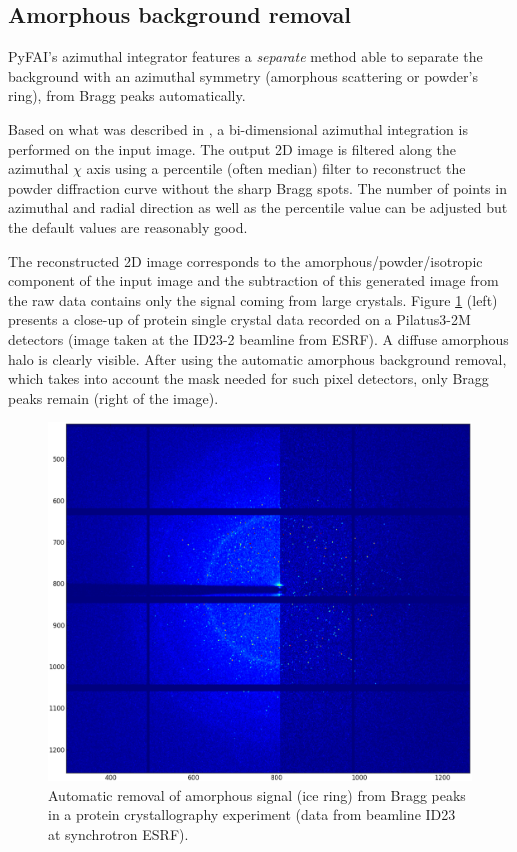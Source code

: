 \documentclass[preprint]{iucr}
\begin{document}
\subsection{Amorphous background removal}

PyFAI's azimuthal integrator features a \textit{separate} method able to separate
the background with an azimuthal symmetry (amorphous scattering or powder's
ring), from Bragg peaks automatically.

Based on what was described in \cite{PyFAI_PDJ}, a bi-dimensional azimuthal
integration is performed on the input image.
The output 2D image is filtered along the azimuthal $\chi$ axis using a
percentile (often median) filter to reconstruct the powder diffraction curve
without the sharp Bragg spots.
The number of points in azimuthal and radial direction as well as
the percentile value can be adjusted but the default values are reasonably
good.

The reconstructed 2D image corresponds to the amorphous/powder/isotropic
component of the input image and the subtraction of this generated image from
the raw data contains only the signal coming from large crystals.
Figure \ref{separate} (left)
presents a close-up of protein single crystal data recorded on a Pilatus3-2M
detectors (image taken at the ID23-2 beamline from ESRF). A
diffuse amorphous halo is clearly visible.
After using the automatic amorphous background removal, which takes into account
the mask needed for such pixel detectors, only Bragg peaks remain (right of
the image).

\begin{figure}
\label{separate}
\begin{center}
\includegraphics[width=15cm]{separate_id23.eps}
\caption{Automatic removal of amorphous signal (ice ring) from Bragg peaks in a
protein crystallography experiment (data from beamline ID23 at synchrotron
ESRF).}
\end{center}
\end{figure}
\end{document}
